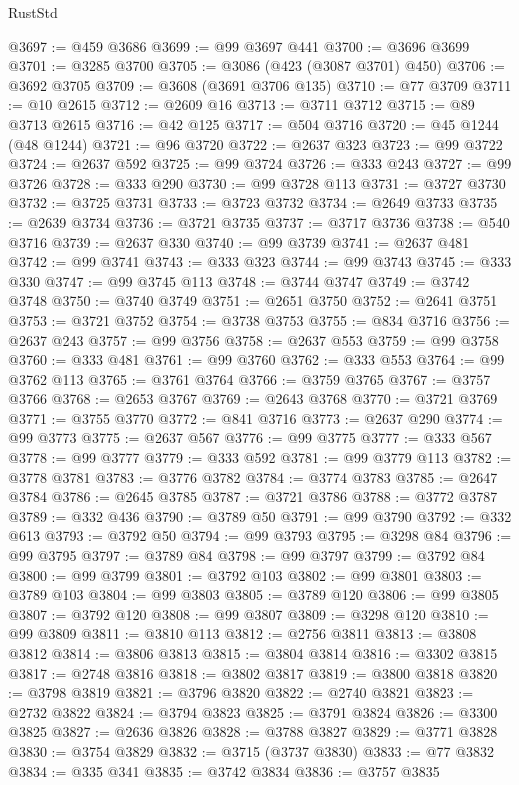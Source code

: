 \begin{lexlean}{RustStd}
\begin{coremodule}
@3697 := @459 @3686
@3699 := @99 @3697 @441
@3700 := @3696 @3699
@3701 := @3285 @3700
@3705 := @3086 (@423 (@3087 @3701) @450)
@3706 := @3692 @3705
@3709 := @3608 (@3691 @3706 @135)
@3710 := @77 @3709
@3711 := @10 @2615
@3712 := @2609 @16
@3713 := @3711 @3712
@3715 := @89 @3713 @2615
@3716 := @42 @125
@3717 := @504 @3716
@3720 := @45 @1244 (@48 @1244)
@3721 := @96 @3720
@3722 := @2637 @323
@3723 := @99 @3722
@3724 := @2637 @592
@3725 := @99 @3724
@3726 := @333 @243
@3727 := @99 @3726
@3728 := @333 @290
@3730 := @99 @3728 @113
@3731 := @3727 @3730
@3732 := @3725 @3731
@3733 := @3723 @3732
@3734 := @2649 @3733
@3735 := @2639 @3734
@3736 := @3721 @3735
@3737 := @3717 @3736
@3738 := @540 @3716
@3739 := @2637 @330
@3740 := @99 @3739
@3741 := @2637 @481
@3742 := @99 @3741
@3743 := @333 @323
@3744 := @99 @3743
@3745 := @333 @330
@3747 := @99 @3745 @113
@3748 := @3744 @3747
@3749 := @3742 @3748
@3750 := @3740 @3749
@3751 := @2651 @3750
@3752 := @2641 @3751
@3753 := @3721 @3752
@3754 := @3738 @3753
@3755 := @834 @3716
@3756 := @2637 @243
@3757 := @99 @3756
@3758 := @2637 @553
@3759 := @99 @3758
@3760 := @333 @481
@3761 := @99 @3760
@3762 := @333 @553
@3764 := @99 @3762 @113
@3765 := @3761 @3764
@3766 := @3759 @3765
@3767 := @3757 @3766
@3768 := @2653 @3767
@3769 := @2643 @3768
@3770 := @3721 @3769
@3771 := @3755 @3770
@3772 := @841 @3716
@3773 := @2637 @290
@3774 := @99 @3773
@3775 := @2637 @567
@3776 := @99 @3775
@3777 := @333 @567
@3778 := @99 @3777
@3779 := @333 @592
@3781 := @99 @3779 @113
@3782 := @3778 @3781
@3783 := @3776 @3782
@3784 := @3774 @3783
@3785 := @2647 @3784
@3786 := @2645 @3785
@3787 := @3721 @3786
@3788 := @3772 @3787
@3789 := @332 @436
@3790 := @3789 @50
@3791 := @99 @3790
@3792 := @332 @613
@3793 := @3792 @50
@3794 := @99 @3793
@3795 := @3298 @84
@3796 := @99 @3795
@3797 := @3789 @84
@3798 := @99 @3797
@3799 := @3792 @84
@3800 := @99 @3799
@3801 := @3792 @103
@3802 := @99 @3801
@3803 := @3789 @103
@3804 := @99 @3803
@3805 := @3789 @120
@3806 := @99 @3805
@3807 := @3792 @120
@3808 := @99 @3807
@3809 := @3298 @120
@3810 := @99 @3809
@3811 := @3810 @113
@3812 := @2756 @3811
@3813 := @3808 @3812
@3814 := @3806 @3813
@3815 := @3804 @3814
@3816 := @3302 @3815
@3817 := @2748 @3816
@3818 := @3802 @3817
@3819 := @3800 @3818
@3820 := @3798 @3819
@3821 := @3796 @3820
@3822 := @2740 @3821
@3823 := @2732 @3822
@3824 := @3794 @3823
@3825 := @3791 @3824
@3826 := @3300 @3825
@3827 := @2636 @3826
@3828 := @3788 @3827
@3829 := @3771 @3828
@3830 := @3754 @3829
@3832 := @3715 (@3737 @3830)
@3833 := @77 @3832
@3834 := @335 @341
@3835 := @3742 @3834
@3836 := @3757 @3835

\end{coremodule}
\end{lexlean}

